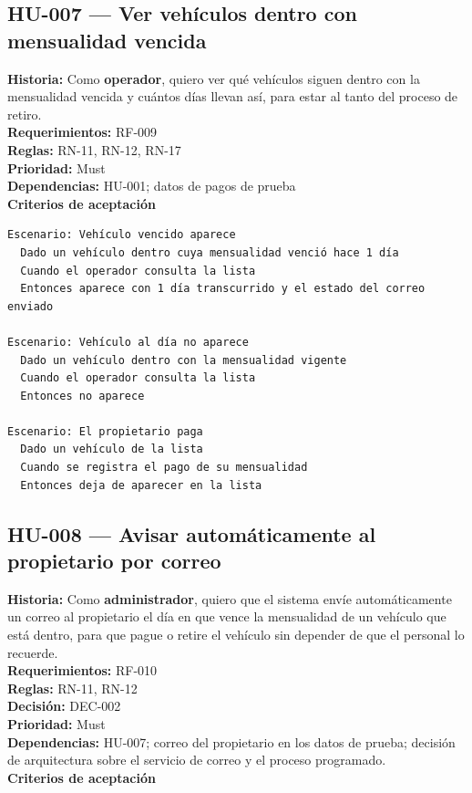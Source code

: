 \subsection{HU-007 — Ver vehículos dentro con mensualidad vencida}
\textbf{Historia:} Como \textbf{operador}, quiero ver qué vehículos siguen dentro con la mensualidad vencida y cuántos días llevan así, para estar al tanto del proceso de retiro.\\
\textbf{Requerimientos:} RF-009\\
\textbf{Reglas:} RN-11, RN-12, RN-17\\
\textbf{Prioridad:} Must\\
\textbf{Dependencias:} HU-001; datos de pagos de prueba\\
\textbf{Criterios de aceptación}

\begin{lstlisting}[style=gherkin]
Escenario: Vehículo vencido aparece
  Dado un vehículo dentro cuya mensualidad venció hace 1 día
  Cuando el operador consulta la lista
  Entonces aparece con 1 día transcurrido y el estado del correo enviado

Escenario: Vehículo al día no aparece
  Dado un vehículo dentro con la mensualidad vigente
  Cuando el operador consulta la lista
  Entonces no aparece

Escenario: El propietario paga
  Dado un vehículo de la lista
  Cuando se registra el pago de su mensualidad
  Entonces deja de aparecer en la lista
\end{lstlisting}

\subsection{HU-008 — Avisar automáticamente al propietario por correo}
\textbf{Historia:} Como \textbf{administrador}, quiero que el sistema envíe automáticamente un correo al propietario el día en que vence la mensualidad de un vehículo que está dentro, para que pague o retire el vehículo sin depender de que el personal lo recuerde.\\
\textbf{Requerimientos:} RF-010\\
\textbf{Reglas:} RN-11, RN-12\\
\textbf{Decisión:} DEC-002\\
\textbf{Prioridad:} Must\\
\textbf{Dependencias:} HU-007; correo del propietario en los datos de prueba; decisión de arquitectura sobre el servicio de correo y el proceso programado.\\
\textbf{Criterios de aceptación}

